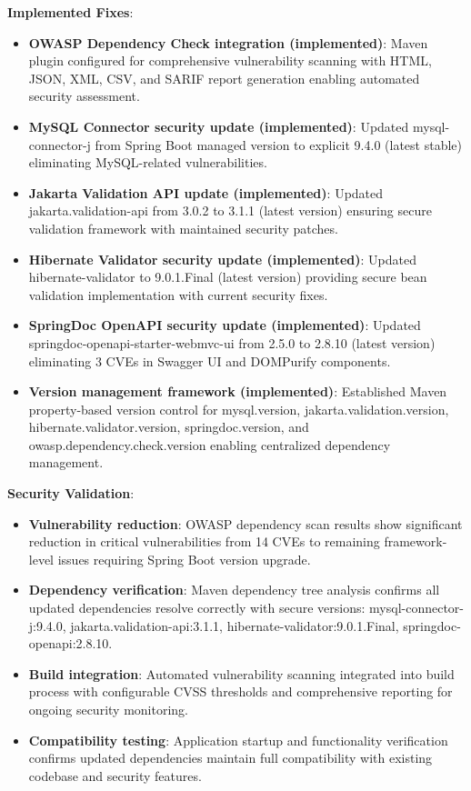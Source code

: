 \documentclass[]{UCD_CS_FYP_Report}
\begin{document}
\textbf{Implemented Fixes}:
\begin{itemize}
	\item \textbf{OWASP Dependency Check integration (implemented)}: Maven plugin configured for comprehensive vulnerability scanning with HTML, JSON, XML, CSV, and SARIF report generation enabling automated security assessment.
	\item \textbf{MySQL Connector security update (implemented)}: Updated mysql-connector-j from Spring Boot managed version to explicit 9.4.0 (latest stable) eliminating MySQL-related vulnerabilities.
	\item \textbf{Jakarta Validation API update (implemented)}: Updated jakarta.validation-api from 3.0.2 to 3.1.1 (latest version) ensuring secure validation framework with maintained security patches.
	\item \textbf{Hibernate Validator security update (implemented)}: Updated hibernate-validator to 9.0.1.Final (latest version) providing secure bean validation implementation with current security fixes.
	\item \textbf{SpringDoc OpenAPI security update (implemented)}: Updated springdoc-openapi-starter-webmvc-ui from 2.5.0 to 2.8.10 (latest version) eliminating 3 CVEs in Swagger UI and DOMPurify components.
	\item \textbf{Version management framework (implemented)}: Established Maven property-based version control for mysql.version, jakarta.validation.version, hibernate.validator.version, springdoc.version, and owasp.dependency.check.version enabling centralized dependency management.
\end{itemize}

\textbf{Security Validation}:
\begin{itemize}
	\item \textbf{Vulnerability reduction}: OWASP dependency scan results show significant reduction in critical vulnerabilities from 14 CVEs to remaining framework-level issues requiring Spring Boot version upgrade.
	\item \textbf{Dependency verification}: Maven dependency tree analysis confirms all updated dependencies resolve correctly with secure versions: mysql-connector-j:9.4.0, jakarta.validation-api:3.1.1, hibernate-validator:9.0.1.Final, springdoc-openapi:2.8.10.
	\item \textbf{Build integration}: Automated vulnerability scanning integrated into build process with configurable CVSS thresholds and comprehensive reporting for ongoing security monitoring.
	\item \textbf{Compatibility testing}: Application startup and functionality verification confirms updated dependencies maintain full compatibility with existing codebase and security features.
\end{itemize}
\end{document}

